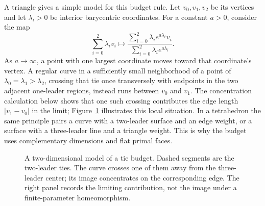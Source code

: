 \documentclass[11pt]{article}
\numberwithin{equation}{section}
\theoremstyle{definition}
\theoremstyle{remark}
\begin{document}
A triangle gives a simple model for this budget rule. Let
$v_0,v_1,v_2$ be its vertices and let $\lambda_i>0$ be interior
barycentric coordinates. For a constant $a>0$, consider the map
\[
 \sum_{i=0}^2\lambda_i v_i
 \longmapsto
 \frac{\sum_{i=0}^2\lambda_i e^{a\lambda_i}v_i}
      {\sum_{i=0}^2\lambda_i e^{a\lambda_i}}.
\]
As $a\to\infty$, a point with one largest coordinate moves toward
that coordinate's vertex. A regular curve in a sufficiently small
neighborhood of a point of $\lambda_0=\lambda_1>\lambda_2$, crossing
that tie once transversely with endpoints in the
two adjacent one-leader regions, instead runs between $v_0$ and
$v_1$. The concentration calculation below shows that one such
crossing contributes the edge length $|v_1-v_0|$ in the limit;
Figure~\ref{lt:tie-model} illustrates this local situation. In a
tetrahedron the same principle pairs a curve with a two-leader
surface and an edge weight, or a surface with a three-leader line
and a triangle weight. This is why the budget uses complementary
dimensions and flat primal faces.

\begin{figure}[tb]
\centering
{}
\caption{A two-dimensional model of a tie budget. Dashed segments
are the two-leader ties. The curve crosses one of them away from
the three-leader center; its image concentrates on the corresponding
edge. The right panel records the limiting contribution, not the
image under a finite-parameter homeomorphism.}
\label{lt:tie-model}
\end{figure}
\end{document}
